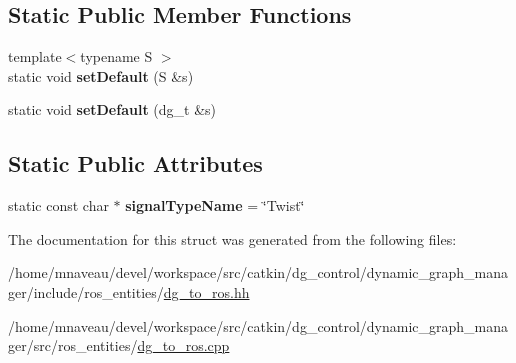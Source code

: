 \subsection*{Static Public Member Functions}
\begin{DoxyCompactItemize}
\item 
{\footnotesize template$<$typename S $>$ }\\static void {\bfseries set\+Default} (S \&s)\hypertarget{structdynamic__graph_1_1DgToRos_3_01specific_1_1Twist_01_4_a103fc59c5fe83026969506d6720d24cd}{}\label{structdynamic__graph_1_1DgToRos_3_01specific_1_1Twist_01_4_a103fc59c5fe83026969506d6720d24cd}

\item 
static void {\bfseries set\+Default} (dg\+\_\+t \&s)\hypertarget{structdynamic__graph_1_1DgToRos_3_01specific_1_1Twist_01_4_a80fcec4f775fd6426af80fa7f819fa9a}{}\label{structdynamic__graph_1_1DgToRos_3_01specific_1_1Twist_01_4_a80fcec4f775fd6426af80fa7f819fa9a}

\end{DoxyCompactItemize}
\subsection*{Static Public Attributes}
\begin{DoxyCompactItemize}
\item 
static const char $\ast$ {\bfseries signal\+Type\+Name} = \char`\"{}Twist\char`\"{}\hypertarget{structdynamic__graph_1_1DgToRos_3_01specific_1_1Twist_01_4_a54d45a12202156921071c9b7d3c83a62}{}\label{structdynamic__graph_1_1DgToRos_3_01specific_1_1Twist_01_4_a54d45a12202156921071c9b7d3c83a62}

\end{DoxyCompactItemize}


The documentation for this struct was generated from the following files\+:\begin{DoxyCompactItemize}
\item 
/home/mnaveau/devel/workspace/src/catkin/dg\+\_\+control/dynamic\+\_\+graph\+\_\+manager/include/ros\+\_\+entities/\hyperlink{dg__to__ros_8hh}{dg\+\_\+to\+\_\+ros.\+hh}\item 
/home/mnaveau/devel/workspace/src/catkin/dg\+\_\+control/dynamic\+\_\+graph\+\_\+manager/src/ros\+\_\+entities/\hyperlink{dg__to__ros_8cpp}{dg\+\_\+to\+\_\+ros.\+cpp}\end{DoxyCompactItemize}
